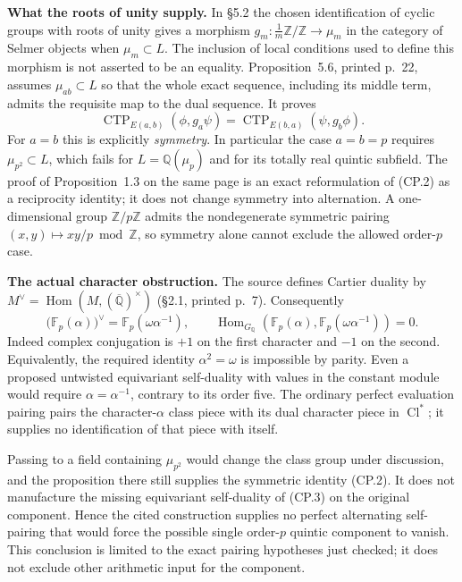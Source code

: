 \documentclass[11pt,a4paper]{article}
\theoremstyle{definition}
\renewcommand{\paragraph}[1]{\par\smallskip\noindent\textbf{#1}\quad\ignorespaces}
\begin{document}
\paragraph{What the roots of unity supply.}
In \S5.2 the chosen identification of cyclic groups with roots of unity
gives a morphism $g_m:\frac1m\mathbb Z/\mathbb Z\to\mu_m$ in the
category of Selmer objects when $\mu_m\subset L$.  The inclusion of local
conditions used to define this morphism is not asserted to be an equality.
Proposition~5.6, printed p.~22, assumes $\mu_{ab}\subset L$ so that the
whole exact sequence, including its middle term, admits the requisite
map to the dual sequence.  It proves
\[
 \operatorname{CTP}_{E(a,b)}(\phi,g_a\psi)
 =\operatorname{CTP}_{E(b,a)}(\psi,g_b\phi).
 \tag{CP.2}
\]
For $a=b$ this is explicitly \emph{symmetry}.  In particular the case
$a=b=p$ requires $\mu_{p^2}\subset L$, which fails for
$L=\mathbb Q(\mu_p)$ and for its totally real quintic subfield.
The proof of Proposition~1.3 on the same page is an exact reformulation
of (CP.2) as a reciprocity identity; it does not change symmetry into
alternation.  A one-dimensional group $\mathbb Z/p\mathbb Z$ admits the
nondegenerate symmetric pairing $(x,y)\mapsto xy/p\bmod\mathbb Z$, so
symmetry alone cannot exclude the allowed order-$p$ case.

\paragraph{The actual character obstruction.}
The source defines Cartier duality by
$M^\vee=\operatorname{Hom}(M,(\overline{\mathbb Q})^\times)$
(\S2.1, printed p.~7).  Consequently
\[
 \bigl(\mathbb F_p(\alpha)\bigr)^\vee
   =\mathbb F_p(\omega\alpha^{-1}),\qquad
 \operatorname{Hom}_{G_{\mathbb Q}}\!
 \left(\mathbb F_p(\alpha),
       \mathbb F_p(\omega\alpha^{-1})\right)=0.
 \tag{CP.3}
\]
Indeed complex conjugation is $+1$ on the first character and $-1$ on
the second.  Equivalently, the required identity $\alpha^2=\omega$
is impossible by parity.  Even a proposed untwisted equivariant
self-duality with values in the constant module would require
$\alpha=\alpha^{-1}$, contrary to its order five.  The ordinary
perfect evaluation pairing pairs the character-$\alpha$ class piece
with its dual character piece in $\operatorname{Cl}^{*}$; it supplies
no identification of that piece with itself.

Passing to a field containing $\mu_{p^2}$ would change the class group
under discussion, and the proposition there still supplies the symmetric
identity (CP.2).  It does not manufacture the missing equivariant
self-duality of (CP.3) on the original component.  Hence the cited
construction supplies no perfect alternating self-pairing that would
force the possible single order-$p$ quintic component to vanish.
This conclusion is limited to the exact pairing hypotheses just checked;
it does not exclude other arithmetic input for the component.
\end{document}
